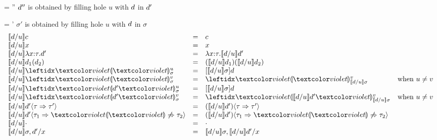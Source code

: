 
\begin{figure}
\small
\judgbox
  { = \dexp''}
  {$d''$ is obtained by filling hole $u$ with $d$ in $d'$}

\vsepRule

\judgbox
  { = \sigma'}
  {$\sigma'$ is obtained by filling hole $u$ with $d$ in $\sigma$}
\[
\begin{array}{lcll}
\instantiate{\dexp}{u}{c}
&=&
c\\
{\instantiate{\dexp}{u}{x}}
&=&
x\\
{\instantiate{\dexp}{u}{\halam{x}{\htau}{\dexp'}}}
&=&
{\halam{x}{\htau}{\instantiate{\dexp}{u}{\dexp'}}}\\
{\instantiate{\dexp}{u}{\dap{d_1}{d_2}}}
&=&
{\dapP{\instantiate{\dexp}{u}{d_1}}{\instantiate{\dexp}{u}{d_2}}}
\\
\instantiate{\dexp}{u}{\dehole{u}{\subst}{}}
&=&
[\instantiate{\dexp}{u}{\subst}]\dexp
\\
\instantiate{\dexp}{u}{\dehole{v}{\subst}{}}
&=&
\dehole{v}{\instantiate{\dexp}{u}{\subst}}{}
& \text{when $u \neq v$}
\\
\instantiate{\dexp}{u}{\dhole{\dexp'}{u}{\subst}{}}
&=&
[\instantiate{\dexp}{u}{\subst}]\dexp
\\
\instantiate{\dexp}{u}{\dhole{\dexp'}{v}{\subst}{}}
&=&
\dhole{\instantiate{\dexp}{u}{\dexp'}}{v}{\instantiate{\dexp}{u}{\subst}}{}
& \text{when $u \neq v$}
\\
%
\instantiate{\dexp}{u}{\dcasttwo{\dexp'}{\htau}{\htau'}}
&=&
\dcasttwo{(\instantiate{\dexp}{u}{\dexp'})}{\htau}{\htau'}
\\
\instantiate{\dexp}{u}{\dcastfail{\dexp'}{\htau_1}{\htau_2}}
&=&
\dcastfail{(\instantiate{\dexp}{u}{\dexp'})}{\htau_1}{\htau_2}\\
\instantiate{\dexp}{u}{\cdot} 
&=&
\cdot\\
\instantiate{\dexp}{u}{\sigma, \dexp'/x} 
&=&
\instantiate{\dexp}{u}{\sigma}, \instantiate{\dexp}{u}\dexp'/x
\end{array}
\]
\vspace{-8px}
\end{figure}

